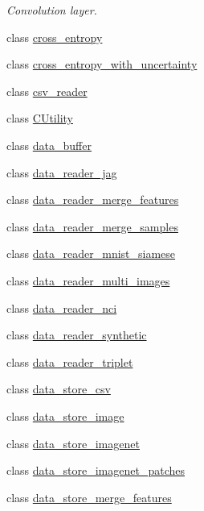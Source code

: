 \begin{DoxyCompactItemize}
\begin{DoxyCompactList}\small\item\em Convolution layer. \end{DoxyCompactList}\item 
class \hyperlink{classlbann_1_1cross__entropy}{cross\+\_\+entropy}
\item 
class \hyperlink{classlbann_1_1cross__entropy__with__uncertainty}{cross\+\_\+entropy\+\_\+with\+\_\+uncertainty}
\item 
class \hyperlink{classlbann_1_1csv__reader}{csv\+\_\+reader}
\item 
class \hyperlink{classlbann_1_1CUtility}{C\+Utility}
\item 
class \hyperlink{classlbann_1_1data__buffer}{data\+\_\+buffer}
\item 
class \hyperlink{classlbann_1_1data__reader__jag}{data\+\_\+reader\+\_\+jag}
\item 
class \hyperlink{classlbann_1_1data__reader__merge__features}{data\+\_\+reader\+\_\+merge\+\_\+features}
\item 
class \hyperlink{classlbann_1_1data__reader__merge__samples}{data\+\_\+reader\+\_\+merge\+\_\+samples}
\item 
class \hyperlink{classlbann_1_1data__reader__mnist__siamese}{data\+\_\+reader\+\_\+mnist\+\_\+siamese}
\item 
class \hyperlink{classlbann_1_1data__reader__multi__images}{data\+\_\+reader\+\_\+multi\+\_\+images}
\item 
class \hyperlink{classlbann_1_1data__reader__nci}{data\+\_\+reader\+\_\+nci}
\item 
class \hyperlink{classlbann_1_1data__reader__synthetic}{data\+\_\+reader\+\_\+synthetic}
\item 
class \hyperlink{classlbann_1_1data__reader__triplet}{data\+\_\+reader\+\_\+triplet}
\item 
class \hyperlink{classlbann_1_1data__store__csv}{data\+\_\+store\+\_\+csv}
\item 
class \hyperlink{classlbann_1_1data__store__image}{data\+\_\+store\+\_\+image}
\item 
class \hyperlink{classlbann_1_1data__store__imagenet}{data\+\_\+store\+\_\+imagenet}
\item 
class \hyperlink{classlbann_1_1data__store__imagenet__patches}{data\+\_\+store\+\_\+imagenet\+\_\+patches}
\item 
class \hyperlink{classlbann_1_1data__store__merge__features}{data\+\_\+store\+\_\+merge\+\_\+features}
\item 

\end{DoxyCompactItemize}
